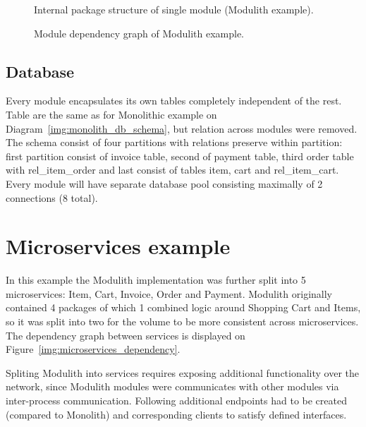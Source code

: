 \begin{figure}
    \centering
    
    \caption{Internal package structure of single module (Modulith example).\label{img:modulith_module_package}}
\end{figure}

\begin{figure}
    \centering
    
    \caption{Module dependency graph of Modulith example. \label{img:modulith_package}}
\end{figure}

\subsection{Database}
Every module encapsulates its own tables completely independent of the rest. Table are the same as for Monolithic example on Diagram~\ref{img:monolith_db_schema}, but relation across modules were removed. The schema consist of four partitions with relations preserve within partition: first partition consist of invoice table, second of payment table, third order table with rel\_item\_order and last consist of tables item, cart and rel\_item\_cart. Every module will have separate database pool consisting maximally of 2 connections (8 total).


\section{Microservices example}
In this example the Modulith implementation was further split into 5 microservices: Item, Cart, Invoice, Order and Payment. Modulith originally contained 4 packages of which 1 combined logic around Shopping Cart and Items, so it was split into two for the volume to be more consistent across microservices. The dependency graph between services is displayed on Figure~\ref{img:microservices_dependency}.

Spliting Modulith into services requires exposing additional functionality over the network, since Modulith modules were communicates with other modules via inter-process communication. Following additional endpoints had to be created (compared to Monolith) and corresponding clients to satisfy defined interfaces.

